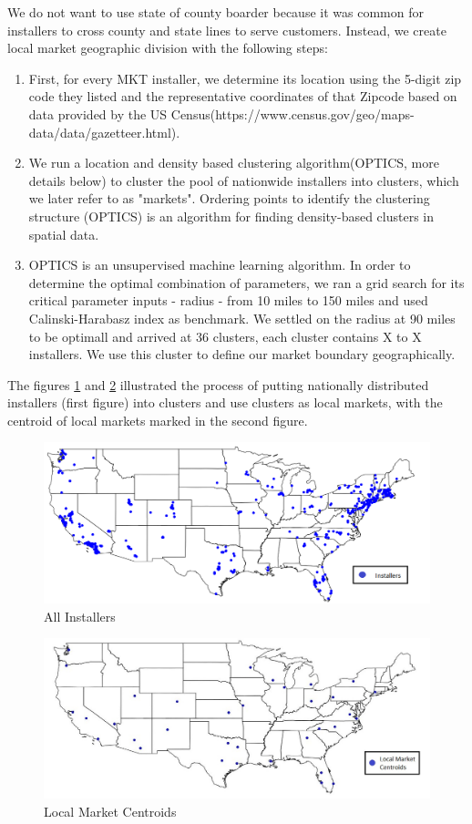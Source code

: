 \documentclass[msom,blindrev]{informs3}
\begin{document}
We do not want to use state of county boarder because it was common for installers to cross county and state lines to serve customers. Instead, we create local market geographic division with the following steps:
\begin{enumerate}
	\item First, for every MKT installer, we determine its location using the 5-digit zip code they listed and the representative coordinates of that Zipcode based on data provided by the US Census(https://www.census.gov/geo/maps-data/data/gazetteer.html).
	\item  We run a location and density based clustering algorithm(OPTICS, more details below) to cluster the pool of nationwide installers into clusters, which we later refer to as "markets".  Ordering points to identify the clustering structure (OPTICS) is an algorithm for finding density-based clusters in spatial data.
	\item OPTICS is an unsupervised machine learning algorithm. In order to determine the optimal combination of parameters, we ran a grid search for its critical parameter inputs - radius - from 10 miles to 150 miles and used Calinski-Harabasz index as benchmark. We settled on the radius at 90 miles to be optimall and arrived at 36 clusters, each cluster contains X to X installers. We use this cluster to define our market boundary geographically.
\end{enumerate}
The figures \ref{fig:nationalinstallers} and \ref{fig:markets} illustrated the process of putting nationally distributed installers (first figure) into clusters and use clusters as local markets, with the centroid of local markets marked in the second figure.
\begin{figure}
	\centering
	\includegraphics[width=1.1\linewidth]{national_installers.png}
	\caption{All Installers}
	\label{fig:nationalinstallers}
\end{figure}
\begin{figure}
	\centering
	\includegraphics[width=1.1\linewidth]{markets.jpg}
	\caption{Local Market Centroids}
	\label{fig:markets}
\end{figure}
\end{document}
